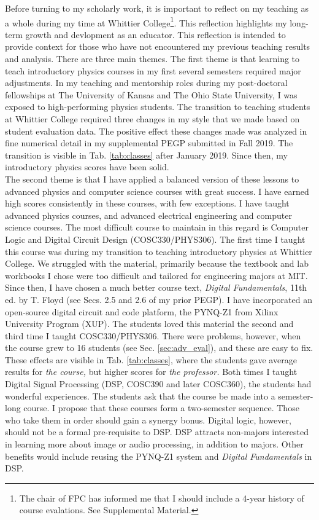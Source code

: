 \documentclass[../../../main.tex]{subfiles}
\begin{document}
Before turning to my scholarly work, it is important to reflect on my teaching as a whole during my time at Whittier College\footnote{The chair of FPC has informed me that I should include a 4-year history of course evalations.  See Supplemental Material.}.  This reflection highlights my long-term growth and devlopment as an educator.  This reflection is intended to provide context for those who have not encountered my previous teaching results and analysis.  There are three main themes.  The first theme is that learning to teach introductory physics courses in my first several semesters required major adjustments.  In my teaching and mentorship roles during my post-doctoral fellowships at The University of Kansas and The Ohio State University, I was exposed to high-performing physics students.  The transition to teaching students at Whittier College required three changes in my style that we made based on student evaluation data.  The positive effect these changes made was analyzed in fine numerical detail in my supplemental PEGP submitted in Fall 2019.  The transition is visible in Tab. \ref{tab:classes} after January 2019. Since then, my introductory physics scores have been solid.
\\
\vspace{0.15cm}
The second theme is that I have applied a balanced version of these lessons to advanced physics and computer science courses with great success.  I have earned high scores consistently in these courses, with few exceptions.  I have taught advanced physics courses, and advanced electrical engineering and computer science courses.  The most difficult course to maintain in this regard is Computer Logic and Digital Circuit Design (COSC330/PHYS306).  The first time I taught this course was during my transition to teaching introductory physics at Whittier College.  We struggled with the material, primarily because the textbook and lab workbooks I chose were too difficult and tailored for engineering majors at MIT.
\\
\vspace{0.15cm}
Since then, I have chosen a much better course text, \textit{Digital Fundamentals}, 11th ed. by T. Floyd \cite{digitalFund} (see Secs. 2.5 and 2.6 of my prior PEGP).  I have incorporated an open-source digital circuit and code platform, the PYNQ-Z1 from Xilinx University Program (XUP).  The students loved this material the second and third time I taught COSC330/PHYS306.  There were problems, however, when the course grew to 16 students (see Sec. \ref{sec:adv_eval}), and these are easy to fix.  These effects are visible in Tab. \ref{tab:classes}, where the students gave average results for \textit{the course,} but higher scores for \textit{the professor.}  Both times I taught Digital Signal Processing (DSP, COSC390 and later COSC360), the students had wonderful experiences.  The students ask that the course be made into a semester-long course.  I propose that these courses form a two-semester sequence.  Those who take them in order should gain a synergy bonus.  Digital logic, however, should not be a formal pre-requisite to DSP.  DSP attracts non-majors interested in learning more about image or audio processing, in addition to majors.  Other benefits would include reusing the PYNQ-Z1 system and \textit{Digital Fundamentals} in DSP.
\end{document}
